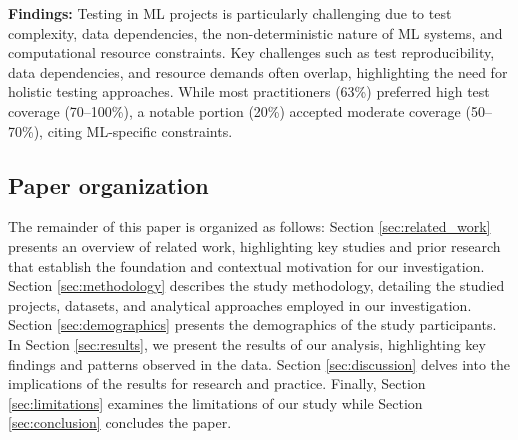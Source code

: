 \begin{itemize}
    \textbf{Findings:} 
    Testing in ML projects is particularly challenging due to test complexity, data dependencies, the non-deterministic nature of ML systems, and computational resource constraints. Key challenges such as test reproducibility, data dependencies, and resource demands often overlap, highlighting the need for holistic testing approaches. While most practitioners (63\%) preferred high test coverage (70–100\%), a notable portion (20\%) accepted moderate coverage (50–70\%), citing ML-specific constraints.
\end{itemize}

\subsection*{\textbf{Paper organization}}

The remainder of this paper is organized as follows: 
Section \ref{sec:related_work} presents an overview of related work, highlighting key studies and prior research that establish the foundation and contextual motivation for our investigation.
Section \ref{sec:methodology} describes the study methodology, detailing the studied projects, datasets, and analytical approaches employed in our investigation. 
Section \ref{sec:demographics} presents the demographics of the study participants.
In Section \ref{sec:results}, we present the results of our analysis, highlighting key findings and patterns observed in the data. 
Section \ref{sec:discussion} delves into the implications of the results for research and practice. Finally, Section \ref{sec:limitations} examines the limitations of our study while Section \ref{sec:conclusion} concludes the paper.